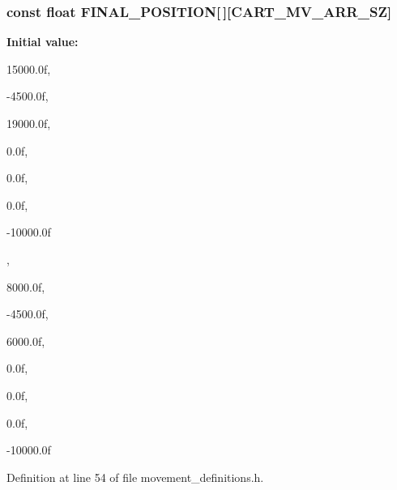 \subsubsection[{\-F\-I\-N\-A\-L\-\_\-\-P\-O\-S\-I\-T\-I\-O\-N}]{\setlength{\rightskip}{0pt plus 5cm}const float {\bf \-F\-I\-N\-A\-L\-\_\-\-P\-O\-S\-I\-T\-I\-O\-N}[$\,$][{\bf \-C\-A\-R\-T\-\_\-\-M\-V\-\_\-\-A\-R\-R\-\_\-\-S\-Z}]}\label{movement__definitions_8h_a5fe0052a1578f9613671455a0e91a77b}
{\bfseries \-Initial value\-:}
\begin{DoxyCode}
 { { 15000.0f,
                                                                               
          -4500.0f,
                                                                               
          19000.0f,
                                                                               
              0.0f,
                                                                               
              0.0f,
                                                                               
              0.0f,
                                                                               
         -10000.0f },
                                                                               
        {  8000.0f,
                                                                               
          -4500.0f,
                                                                               
           6000.0f,
                                                                               
              0.0f,
                                                                               
              0.0f,
                                                                               
              0.0f,
                                                                               
         -10000.0f } }
\end{DoxyCode}


\-Definition at line 54 of file movement\-\_\-definitions.\-h.

